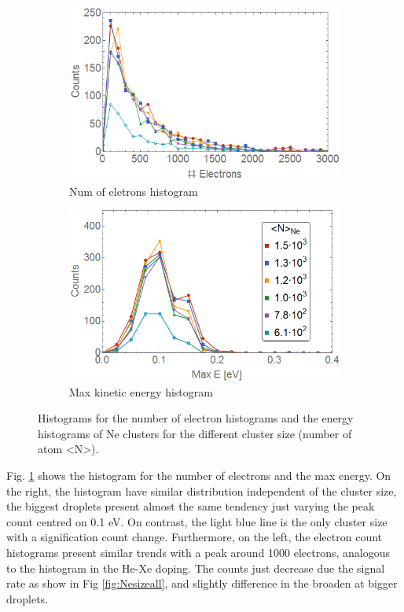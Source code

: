 \begin{figure}[h!]
\hfill
\begin{subfigure}[l]{0.48\textwidth}\caption{Num of eletrons histogram}
\includegraphics[width=1\textwidth]{../Images/results/MIR_Ne_DropletSize/HElec.png} 
\end{subfigure} 
\begin{subfigure}[l]{0.48\textwidth}\caption{Max kinetic energy histogram}
\includegraphics[width=1\textwidth]{../Images/results/MIR_Ne_DropletSize/HEnergc.png} 
\end{subfigure} \hfill
\caption[MIR Ne size dependence.Histograms]{Histograms for the number of electron histograms and the energy histograms of Ne clusters for the different cluster size (number of atom <N>). }
\label{fig:NeonsizeHisto}
\end{figure}

Fig. \ref{fig:NeonsizeHisto} shows the histogram for the number of electrons  and the max energy. On the right, the histogram have similar distribution independent of the cluster size, the biggest droplets present almost the same tendency just varying the peak count centred on 0.1 eV. On contrast, the light blue line is the only cluster size with a signification count change. Furthermore, on the left, the electron count histograms present similar trends with a peak around 1000 electrons, analogous to the histogram in the He-Xe doping. The counts just decrease due the signal rate as show in Fig \ref{fig:Nesizeall}, and slightly difference in the broaden at  bigger droplets. 

